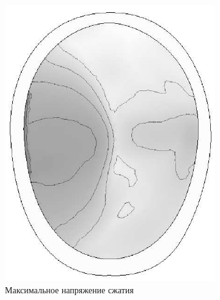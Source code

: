 \begin{figure}[h]
\centering
\begin{subfigure}[b]{0.3\textwidth}
\centering
\includegraphics[width=\textwidth]{png/cranium/2d-problem-res-1.png}
\caption{Максимальное напряжение сжатия}
\end{subfigure}
\begin{subfigure}[b]{0.3\textwidth}
\centering

\end{subfigure}
\end{figure}
